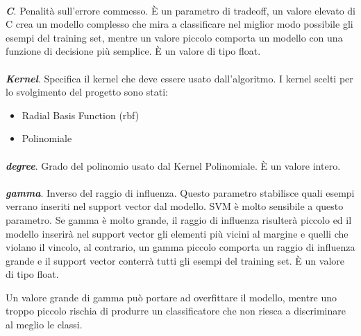 \documentclass[12pt,a4paper,oneside,hidelinks]{report}
\begin{document}
\paragraph*{}
\textbf{\textit{C}}. Penalità sull'errore commesso. È un parametro di tradeoff, un valore elevato di C crea un modello complesso che mira a classificare nel miglior modo possibile gli esempi del training set, mentre un valore piccolo comporta un modello con una funzione di decisione più semplice. È un valore di tipo float. 

\paragraph*{}
\textbf{\textit{Kernel}}. Specifica il kernel che deve essere usato dall'algoritmo. I kernel scelti per lo svolgimento del progetto sono stati:

\begin{itemize}
    \item Radial Basis Function (rbf) 
    \item Polinomiale
\end{itemize}

\paragraph*{}
\textbf{\textit{degree}}. Grado del polinomio usato dal Kernel Polinomiale. È un valore intero.

\paragraph*{}
\textbf{\textit{gamma}}. Inverso del raggio di influenza. Questo parametro stabilisce quali esempi verrano inseriti nel support vector dal modello. SVM è molto sensibile a questo parametro. Se gamma è molto grande, il raggio di influenza risulterà piccolo ed il modello inserirà nel support vector gli elementi più vicini al margine e quelli che violano il vincolo, al contrario, un gamma piccolo comporta un raggio di influenza grande e il support vector conterrà tutti gli esempi del training set. È un valore di tipo float.

Un valore grande di gamma può portare ad overfittare il modello, mentre uno troppo piccolo rischia di produrre un classificatore che non riesca a discriminare al meglio le classi.
\end{document}
